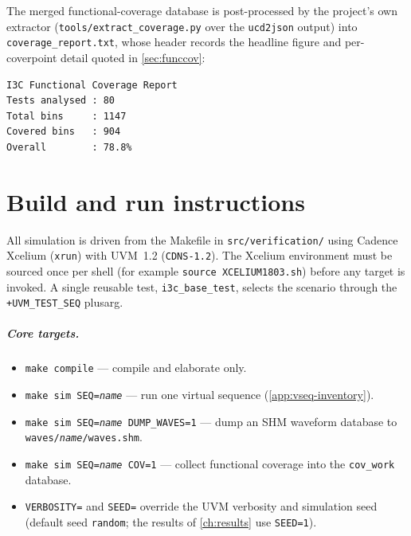 The merged functional-coverage database is post-processed by the project's own extractor
(\texttt{tools/extract\_coverage.py} over the \texttt{ucd2json} output) into
\texttt{coverage\_report.txt}, whose header records the headline figure and per-coverpoint
detail quoted in \cref{sec:funccov}:

\begin{lstlisting}[basicstyle=\ttfamily\scriptsize, breaklines=true]
I3C Functional Coverage Report
Tests analysed : 80
Total bins     : 1147
Covered bins   : 904
Overall        : 78.8%
\end{lstlisting}


\setcounter{chapter}{6}

\chapter{Build and run instructions}
\label{app:build}

All simulation is driven from the Makefile in \texttt{src/verification/} using Cadence
Xcelium (\texttt{xrun}) with UVM~1.2 (\texttt{CDNS-1.2}). The Xcelium environment must be
sourced once per shell (for example \texttt{source XCELIUM1803.sh}) before any target is
invoked. A single reusable test, \texttt{i3c\_base\_test}, selects the scenario through the
\texttt{+UVM\_TEST\_SEQ} plusarg.

\paragraph{Core targets.}
\begin{itemize}
  \item \texttt{make compile} --- compile and elaborate only.
  \item \texttt{make sim SEQ=\textit{name}} --- run one virtual sequence
    (\cref{app:vseq-inventory}).
  \item \texttt{make sim SEQ=\textit{name} DUMP\_WAVES=1} --- dump an SHM waveform database
    to \texttt{waves/\textit{name}/waves.shm}.
  \item \texttt{make sim SEQ=\textit{name} COV=1} --- collect functional coverage into the
    \texttt{cov\_work} database.
  \item \texttt{VERBOSITY=} and \texttt{SEED=} override the UVM verbosity and simulation
    seed (default seed \texttt{random}; the results of \cref{ch:results} use \texttt{SEED=1}).
\end{itemize}

